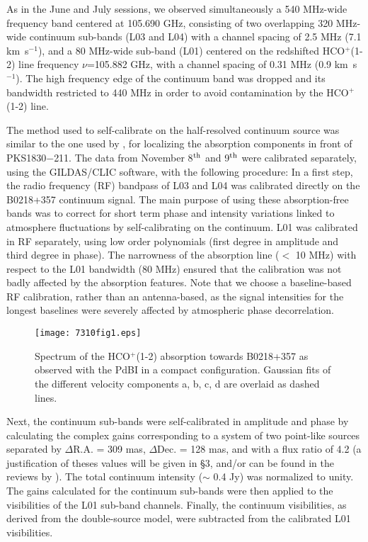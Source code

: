 \documentclass[oldversion]{aa}
\begin{document}
As in the June and July sessions, we observed simultaneously a 540 MHz-wide
frequency band centered at 105.690 GHz, consisting of two overlapping 320 MHz-wide
continuum sub-bands (L03 and L04) with a channel spacing of 2.5 MHz (7.1 km~s$^{-1}$), and a 80 MHz-wide
sub-band (L01) centered on the redshifted HCO$^+$(1-2) line frequency $\nu$=105.882 GHz,
with a channel spacing of 0.31 MHz (0.9 km~s$^{-1}$).
The high frequency edge of the continuum band was dropped and its bandwidth restricted to
440 MHz in order to avoid contamination by the HCO$^+$(1-2) line.

The method used to self-calibrate on the half-resolved continuum source was similar to the
one used by \citet{mul06}, for localizing the absorption components in front of
PKS1830$-$211. The data from November 8$^{\rm th}$ and 9$^{\rm th}$ were calibrated
separately, using the GILDAS/CLIC software, with the following procedure: In a first step,
the radio frequency (RF) bandpass of L03 and L04 was calibrated directly on the B0218+357 continuum signal.
The main purpose of using these
absorption-free bands was to correct for short term phase and
intensity variations linked to atmosphere fluctuations by
self-calibrating on the continuum.
L01 was calibrated in RF separately, using low order polynomials
(first degree in amplitude and third degree in phase). The narrowness
of the absorption line ($<$ 10 MHz) with respect to the L01 bandwidth
(80 MHz) ensured that the calibration was not badly affected by the
absorption features.
Note that we choose a baseline-based RF calibration,
rather than an antenna-based, as the signal intensities for the longest baselines were
severely affected by atmospheric phase decorrelation. 


\begin{figure}[th] \texttt{[image: 7310fig1.eps]}
\caption{Spectrum of the HCO$^+$(1-2) absorption towards B0218+357 as observed with the
PdBI in a compact configuration. Gaussian fits of the different velocity components a, b,
c, d are overlaid as dashed lines. 
} \label{spec}
\end{figure}


Next, the continuum sub-bands were
self-calibrated in amplitude and phase by calculating the complex gains corresponding to
a system of two point-like sources separated by $\Delta$R.A. = 309
mas, $\Delta$Dec. = 128 mas, and with a flux ratio of 4.2 (a justification of
theses values will be given in \S3, and/or can be found in the reviews by
\citealt{wuc04,mit06a,mit06b}). 
The total continuum intensity ($\sim$ 0.4 Jy) was normalized to unity.
The gains calculated for the continuum sub-bands were then applied
to the visibilities of the L01 sub-band channels. Finally, the continuum visibilities, as
derived from the double-source model, were subtracted from the calibrated L01 visibilities.
\end{document}
